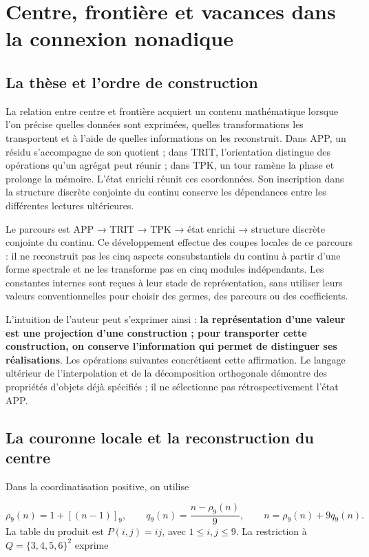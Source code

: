 \section{Centre, frontière et vacances dans la connexion nonadique}
\label{sec:centro-frontera}
\subsection{La thèse et l'ordre de construction}
La relation entre centre et frontière acquiert un contenu mathématique lorsque l'on précise quelles données sont exprimées, quelles transformations les transportent et à l'aide de quelles informations on les reconstruit. Dans APP, un résidu s'accompagne de son quotient ; dans TRIT, l'orientation distingue des opérations qu'un agrégat peut réunir ; dans TPK, un tour ramène la phase et prolonge la mémoire. L'état enrichi réunit ces coordonnées. Son inscription dans la structure discrète conjointe du continu conserve les dépendances entre les différentes lectures ultérieures.

Le parcours est APP → TRIT → TPK → état enrichi → structure discrète conjointe du continu. Ce développement effectue des coupes locales de ce parcours : il ne reconstruit pas les cinq aspects consubstantiels du continu à partir d'une forme spectrale et ne les transforme pas en cinq modules indépendants. Les constantes internes sont reçues à leur stade de représentation, sans utiliser leurs valeurs conventionnelles pour choisir des germes, des parcours ou des coefficients.

L'intuition de l'auteur peut s'exprimer ainsi : \textbf{la représentation d'une valeur est une projection d'une construction ; pour transporter cette construction, on conserve l'information qui permet de distinguer ses réalisations}. Les opérations suivantes concrétisent cette affirmation. Le langage ultérieur de l'interpolation et de la décomposition orthogonale démontre des propriétés d'objets déjà spécifiés ; il ne sélectionne pas rétrospectivement l'état APP.

\subsection{La couronne locale et la reconstruction du centre}
Dans la coordinatisation positive, on utilise

\[
\rho_9(n)=1+[(n-1)]_9,\qquad
q_9(n)=\frac{n-\rho_9(n)}9,
\qquad n=\rho_9(n)+9q_9(n).
\]
La table du produit est \(P(i,j)=ij\), avec \(1\leq i,j\leq9\). La restriction à \(Q=\{3,4,5,6\}^2\) exprime

